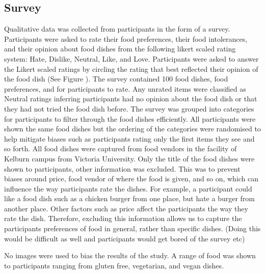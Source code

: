 
\subsection{Survey}

Qualitative data was collected from participants in the form of a survey. Participants were asked to rate their food preferences, their food intolerances, and their opinion about food dishes from the following likert scaled rating system: Hate, Dislike, Neutral, Like, and Love. Participants were asked to answer the Likert scaled ratings by circling the rating that best reflected their opinion of the food dish (See Figure ). The survey contained 100 food dishes,  food preferences, and  for participants to rate. Any unrated items were classified as Neutral ratings inferring participants had no opinion about the food dish or that they had not tried the food dish before. The survey was grouped into categories for participants to filter through the food dishes efficiently. All participants were shown the same food dishes but the ordering of the categories were randomised to help mitigate biases such as participants rating only the first items they see and so forth. All food dishes were captured from food vendors in the facility of Kelburn campus from Victoria University. Only the title of the food dishes were shown to participants, other information was excluded. This was to prevent biases around price, food vendor of where the food is given, and so on, which can influence the way participants rate the dishes. For example, a participant could like a food dish such as a chicken burger from one place, but hate a burger from another place. Other factors such as price affect the participants the way they rate the dish. Therefore, excluding this information allows us to capture the participants preferences of food in general, rather than specific dishes.  (Doing this would be difficult as well and participants would get bored of the survey etc)

No images were used to bias the results of the study. 
A range of food was shown to participants ranging from gluten free, vegetarian, and vegan dishes. 

